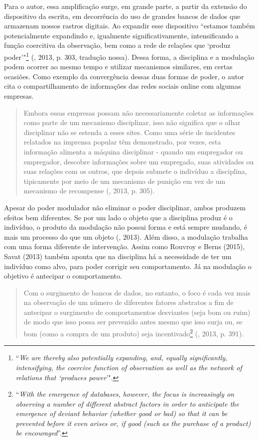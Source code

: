 Para o autor, essa amplificação surge, em grande parte, a partir da
extensão do dispositivo da escrita, em decorrência do uso de grandes
bancos de dados que armazenam nossos rastros digitais. Ao expandir esse
dispositivo ``estamos também potencialmente expandindo e, igualmente
significativamente, intensificando a função coercitiva da observação,
bem como a rede de relações que `produz poder'"\footnote{``\emph{We are
  thereby also potentially expanding, and, equally significantly,
  intensifying, the coercive function of observation as well as the
  network of relations that `produces power}'".}
(, 2013, p. 303, tradução nossa).
Dessa forma, a disciplina e a modulação podem ocorrer ao mesmo tempo e
utilizar mecanismos similares, em certas ocasiões. Como exemplo da
convergência dessas duas formas de poder, o autor cita o
compartilhamento de informações das redes sociais online com algumas
empresas.

\begin{quote}
Embora essas empresas possam não necessariamente coletar as informações
como parte de um mecanismo disciplinar, isso não significa que o olhar
disciplinar não se estenda a esses sites. Como uma série de incidentes
relatados na imprensa popular têm demonstrado, por vezes, esta
informação alimenta a máquina disciplinar - quando um empregador ou
empregador, descobre informações sobre um empregado, suas atividades ou
suas relações com os outros, que depois submete o indivíduo a
disciplina, tipicamente por meio de um mecanismo de punição em vez de um
mecanismo de recompense (, 2013, p. 305).
\end{quote}

Apesar do poder modulador não eliminar o poder disciplinar, ambos
produzem efeitos bem diferentes. Se por um lado o objeto que a
disciplina produz é o indivíduo, o produto da modulação não possui forma
e está sempre mudando, é mais um processo do que um objeto
(, 2013). Além disso, a modulação trabalha com uma forma diferente de
intervenção. Assim como Rouvroy e Berns (2015), Savat (2013) também
aponta que na disciplina há a necessidade de ter um indivíduo como alvo,
para poder corrigir seu comportamento. Já na modulação o objetivo é
antecipar o comportamento.

\begin{quote}
Com o surgimento de bancos de dados, no entanto, o foco é cada vez mais
na observação de um número de diferentes fatores abstratos a fim de
antecipar o surgimento de comportamentos desviantes (seja bom ou ruim)
de modo que isso possa ser prevenido antes mesmo que isso surja ou, se
bom (como a compra de um produto) seja incentivado\footnote{``\emph{With the
  emergence of databases, however, the focus is increasingly on
  observing a number of different abstract factors in order to
  anticipate the emergence of deviant behavior (whether good or bad) so
  that it can be prevented before it even arises or, if good (such as
  the purchase of a product) be encouraged}''.}
(, 2013, p. 391).
\end{quote}

